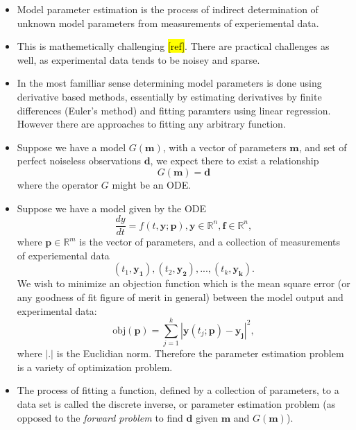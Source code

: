 \documentclass[10pt,a4paper]{article}
\begin{document}
\begin{itemize}
\item Model parameter estimation is the process of indirect determination of unknown model parameters  from measurements of experiemental data.
\item This is mathemetically challenging \hl{[ref]}. There are practical challenges as well, as experimental data tends to be noisey and sparse.
\item In the most familliar sense determining model parameters is done using derivative based methods, essentially by estimating derivatives by finite differences (Euler's method) and fitting paramters using linear regression. However there are approaches to fitting any arbitrary function.
\item Suppose we have a model $G(\mathbf{m})$, with a vector of parameters $\mathbf{m}$, and set of perfect noiseless observations $\mathbf{d}$, we expect there to exist a relationship 
\[G(\mathbf{m}) = \mathbf{d} \]
where the operator $G$ might be an ODE.
\item Suppose we have a model given by the ODE
\[ \frac{dy}{dt} = f(t, \mathbf{y}; \mathbf{p}), \mathbf{y} \in \mathbb{R}^n, \mathbf{f} \in \mathbb{R}^n ,\]
where $\mathbf{p} \in \mathbb{R}^m$ is the vector of parameters, and a collection of measurements of experiemental data
\[ \left( t_1, \mathbf{y_1} \right), 
\left( t_2, \mathbf{y_2} \right), ... ,
\left( t_k, \mathbf{y_k} \right).\]
We wish to minimize an objection function which is the mean square error (or any goodness of fit figure of merit in general) between the model output and experimental data:
\[ \mbox{obj}(\mathbf{p}) = \sum_{j=1}^k \left|\mathbf{y}(t_j; \mathbf{p}) - \mathbf{y_j} \right|^2,\]
where $| . |$ is the Euclidian norm. Therefore the parameter estimation problem is a variety of optimization problem.
\item The process of fitting a function, defined by a collection of parameters, to a data set is called the discrete inverse, or parameter estimation problem (as opposed to the \emph{forward problem} to find $\mathbf{d}$ given $\mathbf{m}$ and $G(\mathbf{m})$).


\end{itemize}
\end{document}
